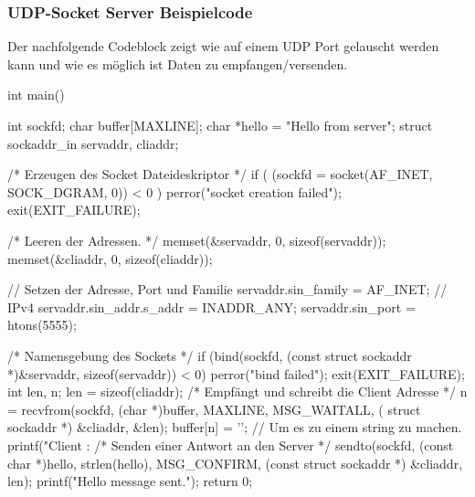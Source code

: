 \subsubsection{UDP-Socket Server Beispielcode}
Der nachfolgende Codeblock zeigt wie auf einem UDP Port gelauscht werden kann und wie es möglich ist Daten zu empfangen/versenden.
\begin{program}[H]
    \begin{CppCode}
        int main() {
            int sockfd;
            char buffer[MAXLINE];
            char *hello = "Hello from server";
            struct sockaddr_in servaddr, cliaddr;
            
            /* Erzeugen des Socket Dateideskriptor */
            if ( (sockfd = socket(AF_INET, SOCK_DGRAM, 0)) < 0 ) {
                perror("socket creation failed");
                exit(EXIT_FAILURE);
            }

            /* Leeren der Adressen. */
            memset(&servaddr, 0, sizeof(servaddr));
            memset(&cliaddr, 0, sizeof(cliaddr));

            // Setzen der Adresse, Port und Familie
            servaddr.sin_family = AF_INET; // IPv4
            servaddr.sin_addr.s_addr = INADDR_ANY;
            servaddr.sin_port = htons(5555); 

            /* Namensgebung des Sockets */
            if (bind(sockfd, (const struct sockaddr *)&servaddr, sizeof(servaddr)) < 0) {
                perror("bind failed");
                exit(EXIT_FAILURE);
            }
            int len, n;
            len = sizeof(cliaddr);
            /* Empfängt und schreibt die Client Adresse */
            n = recvfrom(sockfd, (char *)buffer, MAXLINE, MSG_WAITALL, ( struct sockaddr *) &cliaddr, &len);
            buffer[n] = '\0'; // Um es zu einem string zu machen.
            printf("Client : %
            /* Senden einer Antwort an den Server */
            sendto(sockfd, (const char *)hello, strlen(hello), MSG_CONFIRM, (const struct sockaddr *) &cliaddr, len);
            printf("Hello message sent.\n");
            return 0;
        }
    \end{CppCode}
\end{program}
\noindent
\newpage
